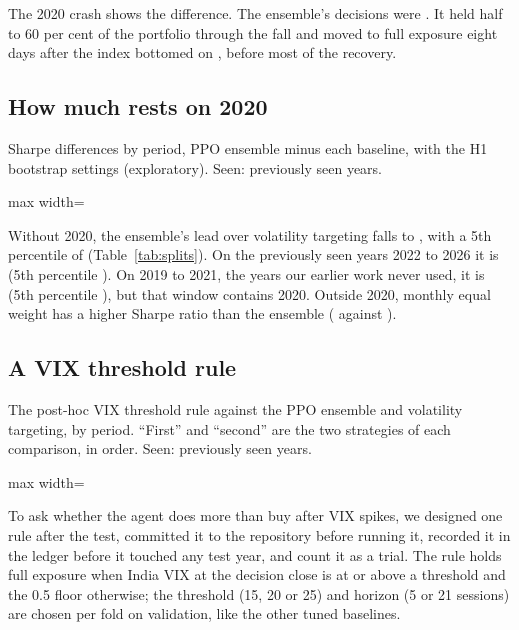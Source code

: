 \documentclass[11pt]{article}
\newcommand{\gtab}[1]{\begin{adjustbox}{max width=\linewidth}\end{adjustbox}}
\begin{document}
The 2020 crash shows the difference. The ensemble's decisions were \CrashDecisions{}. It held half to 60 per cent of the portfolio through the fall and moved to full exposure eight days after the index bottomed on \EpiTrough{}, before most of the recovery.

\subsection{How much rests on 2020}

\begin{table}[t]
\centering\small
\caption{Sharpe differences by period, PPO ensemble minus each baseline, with the H1 bootstrap settings (exploratory). Seen: previously seen years.}
\label{tab:splits}
\gtab{tab_splits.tex}
\end{table}

Without 2020, the ensemble's lead over volatility targeting falls to \ExNoDelta{}, with a 5th percentile of \ExNoPfive{} (Table~\ref{tab:splits}). On the previously seen years 2022 to 2026 it is \ExSeenDelta{} (5th percentile \ExSeenPfive{}). On 2019 to 2021, the years our earlier work never used, it is \ExUnseenDelta{} (5th percentile \ExUnseenPfive{}), but that window contains 2020. Outside 2020, monthly equal weight has a higher Sharpe ratio than the ensemble (\ExNoEW{} against \ExNoPPO{}).

\subsection{A VIX threshold rule}\label{sec:vixrule}

\begin{table}[t]
\centering\small
\caption{The post-hoc VIX threshold rule against the PPO ensemble and volatility targeting, by period. ``First'' and ``second'' are the two strategies of each comparison, in order. Seen: previously seen years.}
\label{tab:vixrule}
\gtab{tab_vix_rule.tex}
\end{table}

To ask whether the agent does more than buy after VIX spikes, we designed one rule after the test, committed it to the repository before running it, recorded it in the ledger before it touched any test year, and count it as a trial. The rule holds full exposure when India VIX at the decision close is at or above a threshold and the 0.5 floor otherwise; the threshold (15, 20 or 25) and horizon (5 or 21 sessions) are chosen per fold on validation, like the other tuned baselines.
\end{document}
